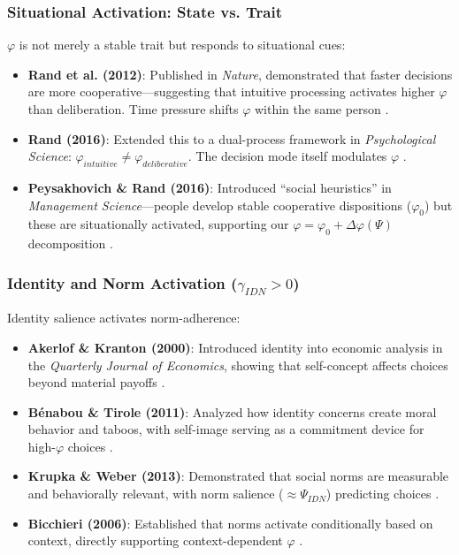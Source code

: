 \subsubsection{Situational Activation: State vs. Trait}

$\varphi$ is not merely a stable trait but responds to situational cues:

\begin{itemize}
\item \textbf{Rand et al. (2012)}: Published in \textit{Nature}, demonstrated that faster decisions are more cooperative---suggesting that intuitive processing activates higher $\varphi$ than deliberation. Time pressure shifts $\varphi$ within the same person \cite{rand2012}.

\item \textbf{Rand (2016)}: Extended this to a dual-process framework in \textit{Psychological Science}: $\varphi_{intuitive} \neq \varphi_{deliberative}$. The decision mode itself modulates $\varphi$ \cite{rand2016}.

\item \textbf{Peysakhovich \& Rand (2016)}: Introduced ``social heuristics'' in \textit{Management Science}---people develop stable cooperative dispositions ($\varphi_0$) but these are situationally activated, supporting our $\varphi = \varphi_0 + \Delta\varphi(\Psi)$ decomposition \cite{peysakhovich2016}.
\end{itemize}

\subsubsection{Identity and Norm Activation ($\gamma_{IDN} > 0$)}

Identity salience activates norm-adherence:

\begin{itemize}
\item \textbf{Akerlof \& Kranton (2000)}: Introduced identity into economic analysis in the \textit{Quarterly Journal of Economics}, showing that self-concept affects choices beyond material payoffs \cite{akerlof2000}.

\item \textbf{Bénabou \& Tirole (2011)}: Analyzed how identity concerns create moral behavior and taboos, with self-image serving as a commitment device for high-$\varphi$ choices \cite{benabou2011}.

\item \textbf{Krupka \& Weber (2013)}: Demonstrated that social norms are measurable and behaviorally relevant, with norm salience ($\approx \Psi_{IDN}$) predicting choices \cite{krupka2013}.

\item \textbf{Bicchieri (2006)}: Established that norms activate conditionally based on context, directly supporting context-dependent $\varphi$ \cite{bicchieri2006}.
\end{itemize}

